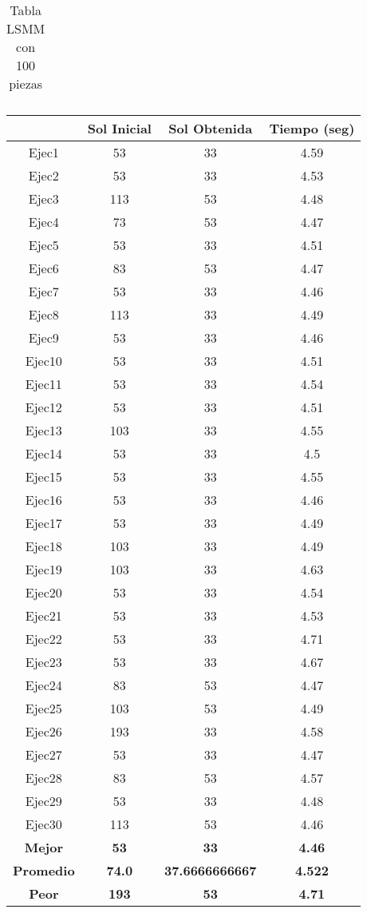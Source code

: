\begin{center}
\begin{table}
\begin{tabular}{|c|c|c|c|}
\end{tabular}
\caption{Tabla LSMM con 100 piezas}
\end{table}

\begin{table}

\begin{tabular}{|c|c|c|c|}



\hline
 & {\bf Sol Inicial} & {\bf Sol Obtenida} & {\bf Tiempo (seg)} \\
\hline
Ejec1 & 53 & 33  & 4.59 \\
\hline
Ejec2 & 53 & 33  & 4.53 \\
\hline
Ejec3 & 113 & 53  & 4.48 \\
\hline
Ejec4 & 73 & 53  & 4.47 \\
\hline
Ejec5 & 53 & 33  & 4.51 \\
\hline
Ejec6 & 83 & 53  & 4.47 \\
\hline
Ejec7 & 53 & 33  & 4.46 \\
\hline
Ejec8 & 113 & 33  & 4.49 \\
\hline
Ejec9 & 53 & 33  & 4.46 \\
\hline
Ejec10 & 53 & 33  & 4.51 \\
\hline
Ejec11 & 53 & 33  & 4.54 \\
\hline
Ejec12 & 53 & 33  & 4.51 \\
\hline
Ejec13 & 103 & 33  & 4.55 \\
\hline
Ejec14 & 53 & 33  & 4.5 \\
\hline
Ejec15 & 53 & 33  & 4.55 \\
\hline
Ejec16 & 53 & 33  & 4.46 \\
\hline
Ejec17 & 53 & 33  & 4.49 \\
\hline
Ejec18 & 103 & 33  & 4.49 \\
\hline
Ejec19 & 103 & 33  & 4.63 \\
\hline
Ejec20 & 53 & 33  & 4.54 \\
\hline
Ejec21 & 53 & 33  & 4.53 \\
\hline
Ejec22 & 53 & 33  & 4.71 \\
\hline
Ejec23 & 53 & 33  & 4.67 \\
\hline
Ejec24 & 83 & 53  & 4.47 \\
\hline
Ejec25 & 103 & 53  & 4.49 \\
\hline
Ejec26 & 193 & 33  & 4.58 \\
\hline
Ejec27 & 53 & 33  & 4.47 \\
\hline
Ejec28 & 83 & 53  & 4.57 \\
\hline
Ejec29 & 53 & 33  & 4.48 \\
\hline
Ejec30 & 113 & 53  & 4.46 \\
\hline
{\bf Mejor} & {\bf 53} & {\bf 33} & {\bf 4.46} \\
\hline
{\bf Promedio} & {\bf 74.0} & {\bf 37.6666666667} & {\bf 4.522} \\
\hline
{\bf Peor} & {\bf 193} & {\bf 53} & {\bf 4.71} \\
\hline


\end{tabular}
\end{table}
\end{center}
